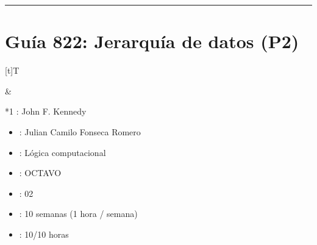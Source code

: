 \documentclass[letterpaper,10pt,spanish]{sphinxmanual}
\begin{document}
\bigskip\hrule\bigskip


\sphinxstepscope


\section{Guía 822: Jerarquía de datos (P2)}
\label{\detokenize{1_guias/8logica/G822:guia-822-jerarquia-de-datos-p2}}\label{\detokenize{1_guias/8logica/G822::doc}}

\begin{savenotes}\sphinxattablestart
\sphinxthistablewithglobalstyle
\centering
\begin{tabular}[t]{}
\sphinxtoprule
\sphinxtableatstartofbodyhook

\begin{savenotes}\sphinxattablestart
\sphinxthistablewithglobalstyle
\centering
\begin{tabulary}{\linewidth}[t]{T}
\sphinxtoprule
\sphinxtableatstartofbodyhook
\sphinxAtStartPar
{}
\\
\sphinxbottomrule
\end{tabulary}
\sphinxtableafterendhook\par
\sphinxattableend\end{savenotes}
&

\begin{savenotes}\sphinxattablestart
\sphinxthistablewithglobalstyle
\raggedright
\begin{tabular}[t]{*{1}{}}
\sphinxtoprule
\sphinxtableatstartofbodyhook
\sphinxAtStartPar
{}: John F. Kennedy
\begin{itemize}
\item {} 
\sphinxAtStartPar
{}: Julian Camilo Fonseca Romero

\item {} 
\sphinxAtStartPar
{}: Lógica computacional

\item {} 
\sphinxAtStartPar
{}: OCTAVO

\item {} 
\sphinxAtStartPar
{}: 02

\item {} 
\sphinxAtStartPar
{}: 10 semanas (1 hora / semana)

\item {} 
\sphinxAtStartPar
{}: 10/10 horas

\end{itemize}
\\
\sphinxbottomrule
\end{tabular}
\sphinxtableafterendhook\par
\sphinxattableend\end{savenotes}
\\
\sphinxbottomrule
\end{tabular}
\sphinxtableafterendhook\par
\sphinxattableend\end{savenotes}
\end{document}
